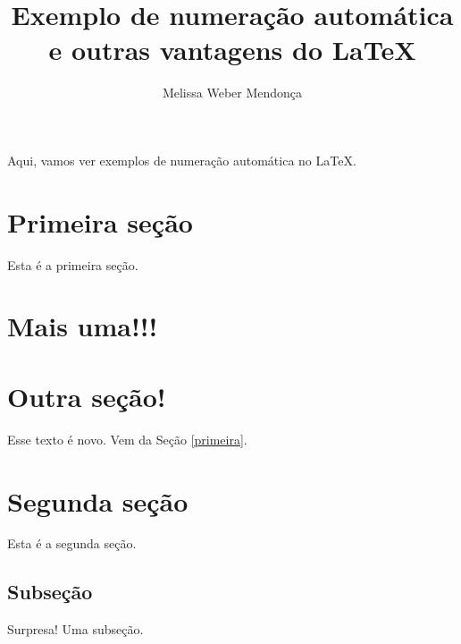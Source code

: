 \documentclass{article}
\author{Melissa Weber Mendonça}
\title{Exemplo de numeração automática\\e outras vantagens do \LaTeX}
\begin{document}
\maketitle


Aqui, vamos ver exemplos de numeração automática no \LaTeX. 

\section{Primeira seção\label{primeira}}

Esta é a primeira seção.

\section{Mais uma!!!}

\section{Outra seção!}

Esse texto é novo. Vem da Seção \ref{primeira}.

\section{Segunda seção}

Esta é a segunda seção.

\subsection{Subseção}

Surpresa! Uma subseção.
\end{document}

